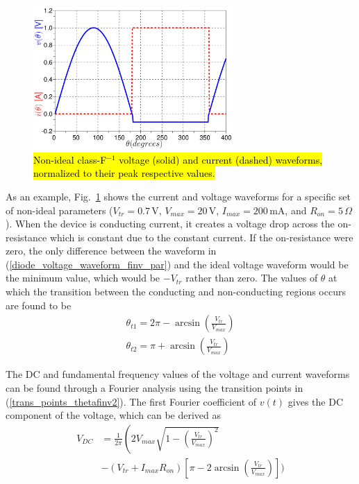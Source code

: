 \documentclass[journal]{IEEEtran}
\begin{document}
\begin{figure}[!b]
  \begin{center}
  \includegraphics[width=3.0in]{pdf/05.pdf}
  \caption{\hl{Non-ideal class-F$^{-1}$ voltage (solid) and current (dashed) waveforms, normalized to their peak respective values.}}\label{finv_waveform_nonideal}
  \end{center}
\end{figure}

As an example, Fig.~\ref{finv_waveform_nonideal} shows the current and voltage waveforms for a specific set of non-ideal parameters ($V_{tr} = 0.7\,\textrm{V}$, $V_{max} = 20\,\textrm{V}$, $I_{max} = 200\,\textrm{mA}$, and $R_{on} = 5\,\Omega$). When the device is conducting current, it creates a voltage drop across the on-resistance which is constant due to the constant current. If the on-resistance were zero, the only difference between the waveform in (\ref{diode_voltage_waveform_finv_par}) and the ideal voltage waveform would be the minimum value, which would be $-V_{tr}$ rather than zero. The values of $\theta$ at which the transition between the conducting and non-conducting regions occurs are found to be
\begin{equation}\label{trans_points_thetafinv2}
\begin{array}{l}
    \theta_{t1} = 2\pi - \arcsin\left(\frac{V_{tr}}{V_{max}}\right) \\
    \theta_{t2} = \pi + \arcsin\left(\frac{V_{tr}}{V_{max}}\right)
\end{array}
\end{equation}

The DC and fundamental frequency values of the voltage and current waveforms can be found through a Fourier analysis using the transition points in (\ref{trans_points_thetafinv2}). The first Fourier coefficient of $v(t)$ gives the DC component of the voltage, which can be derived as
\begin{equation}\label{finv_dc_comp_5}\begin{split}
    V_{DC} &= \frac{1}{2\pi}\left(2V_{max}\sqrt{1 - \left(\frac{V_{tr}}{V_{max}}\right)^2} \right. \\
    &-(V_{tr} + I_{max}R_{on})\left[\pi - 2\arcsin\left(\frac{V_{tr}}{V_{max}}\right)\right]\Bigg)
\end{split}\end{equation}
\end{document}
